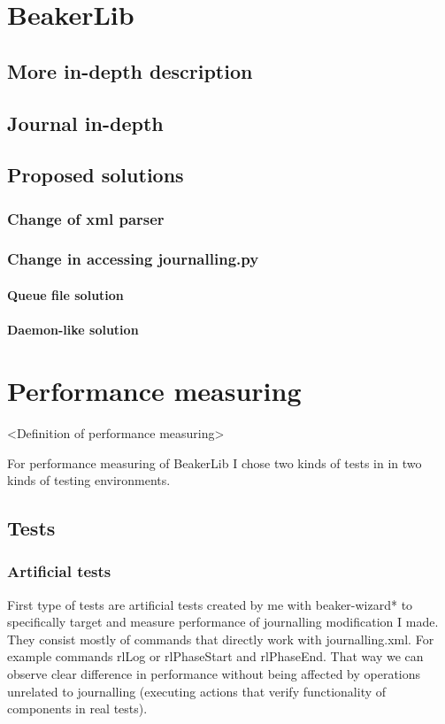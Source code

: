 \chapter{BeakerLib}

\section{More in-depth description}

\section{Journal in-depth}

\section{Proposed solutions}

\subsection{Change of xml parser}

\subsection{Change in accessing journalling.py}

\subsubsection{Queue file solution}


\subsubsection{Daemon-like solution}



\chapter{Performance measuring}
<Definition of performance measuring>

For performance measuring of BeakerLib I chose two kinds of tests in in two kinds of testing environments.

\section{Tests}

\subsection{Artificial tests}
First type of tests are artificial tests created by me with beaker-wizard* to specifically target and measure performance of journalling modification I made. They consist mostly of commands that directly work with journalling.xml. For example commands rlLog or rlPhaseStart and rlPhaseEnd. That way we can observe clear difference in performance without being affected by operations unrelated to journalling (executing actions that verify functionality of components in real tests). 

